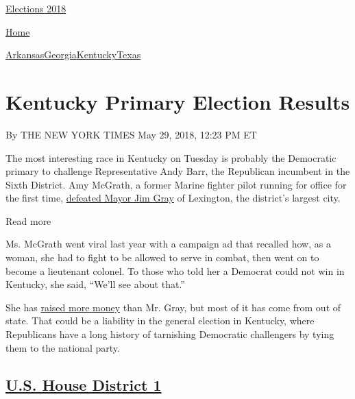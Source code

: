 \href{//www.nytimes3xbfgragh.onion}{}\href{https://www.nytimes3xbfgragh.onion/interactive/2018/us/elections/calendar-primary-results.html}{
Elections 2018}

\href{//www.nytimes3xbfgragh.onion}{ Home}

\href{https://www.nytimes3xbfgragh.onion/interactive/2018/05/22/us/elections/results-arkansas-primary-elections.html}{Arkansas}\href{https://www.nytimes3xbfgragh.onion/interactive/2018/05/22/us/elections/results-georgia-primary-elections.html}{Georgia}\href{https://www.nytimes3xbfgragh.onion/interactive/2018/05/22/us/elections/results-kentucky-primary-elections.html}{Kentucky}\href{https://www.nytimes3xbfgragh.onion/interactive/2018/05/22/us/elections/results-texas-primary-runoff-elections.html}{Texas}

\hypertarget{kentucky-primary-election-results}{%
\section{Kentucky Primary Election
Results}\label{kentucky-primary-election-results}}

By THE NEW YORK TIMES May 29, 2018, 12:23 PM ET

The most interesting race in Kentucky on Tuesday is probably the
Democratic primary to challenge Representative Andy Barr, the Republican
incumbent in the Sixth District. Amy McGrath, a former Marine fighter
pilot running for office for the first time,
\href{https://www.nytimes3xbfgragh.onion/2018/05/22/us/politics/kentucky-election-mcgrath.html}{defeated
Mayor Jim Gray} of Lexington, the district's largest city.

Read more

Ms. McGrath went viral last year with a campaign ad that recalled how,
as a woman, she had to fight to be allowed to serve in combat, then went
on to become a lieutenant colonel. To those who told her a Democrat
could not win in Kentucky, she said, ``We'll see about that.''

She has
\href{https://www.nytimes3xbfgragh.onion/interactive/2018/05/02/us/politics/democratic-fundraising-midterm-elections.html}{raised
more money} than Mr. Gray, but most of it has come from out of state.
That could be a liability in the general election in Kentucky, where
Republicans have a long history of tarnishing Democratic challengers by
tying them to the national party.

\hypertarget{us-house-district-1}{%
\subsection{\texorpdfstring{\href{https://www.nytimes3xbfgragh.onion/elections/results/kentucky-house-district-1-primary-election}{U.S.
House District 1}}{U.S. House District 1}}\label{us-house-district-1}}

